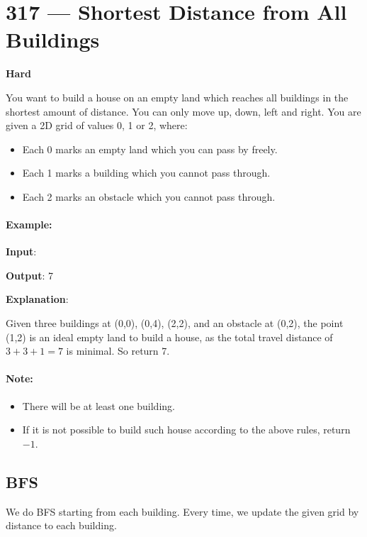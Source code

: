 \section{317 --- Shortest Distance from All Buildings}

\textbf{Hard}

You want to build a house on an empty land which reaches all buildings in the shortest amount of distance. You can only move up, down, left and right. You are given a 2D grid of values 0, 1 or 2, where:

\begin{itemize}
\item Each 0 marks an empty land which you can pass by freely.
\item Each 1 marks a building which you cannot pass through.
\item Each 2 marks an obstacle which you cannot pass through.
\end{itemize}

\paragraph{Example:}

\begin{flushleft}
\textbf{Input}: \fcj{[[1,0,2,0,1],[0,0,0,0,0],[0,0,1,0,0]]}


\textbf{Output}: 7 

\textbf{Explanation}: 

Given three buildings at (0,0), (0,4), (2,2), and an obstacle at (0,2), the point (1,2) is an ideal empty land to build a house, as the total travel distance of $3+3+1=7$ is minimal. So return 7.
\end{flushleft}

\paragraph{Note:}
\begin{itemize}
\item There will be at least one building. 
\item If it is not possible to build such house according to the above rules, return $-1$.
\end{itemize}

\subsection{BFS}
We do BFS starting from each building. Every time, we update the given grid by distance to each building.

